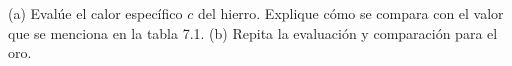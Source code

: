 \item (a) Evalúe el calor específico $c$ del hierro. Explique cómo se compara con el valor que se menciona en la tabla 7.1. (b) Repita la evaluación y comparación para el oro.
